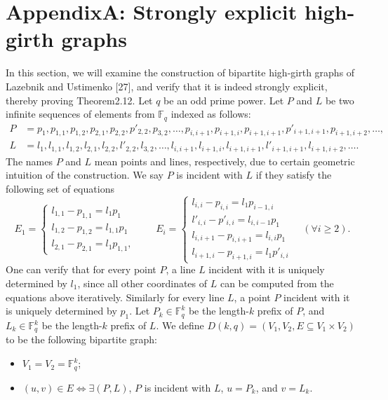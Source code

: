 \section*{AppendixA: Strongly explicit high-girth graphs}
In this section, we will examine the construction of bipartite high-girth graphs of Lazebnik and Ustimenko [27], and verify that it is indeed strongly explicit, thereby proving Theorem2.12.
Let $q$ be an odd prime power. Let $P$ and $L$ be two infinite sequences of elements from $\mathbb F_q$ indexed as follows:
\begin{align*}
P&=p_1,p_{1,1},p_{1,2},p_{2,1},p_{2,2},p'_{2,2},p_{3,2},\ldots,p_{i,i+1},p_{i+1,i},p_{i+1,i+1},p'_{i+1,i+1},p_{i+1,i+2},\ldots,\\
L&=l_1,l_{1,1},l_{1,2},l_{2,1},l_{2,2},l'_{2,2},l_{3,2},\ldots,l_{i,i+1},l_{i+1,i},l_{i+1,i+1},l'_{i+1,i+1},l_{i+1,i+2},\ldots.
\end{align*}
The names $P$ and $L$ mean points and lines, respectively, due to certain geometric intuition of the construction. We say $P$ is incident with $L$ if they satisfy the following set of equations
\begin{equation}\tag{3}
E_1=\begin{cases}l_{1,1}-p_{1,1}=l_1p_1\\l_{1,2}-p_{1,2}=l_{1,1}p_1\\l_{2,1}-p_{2,1}=l_1p_{1,1},\end{cases}\qquad
E_i=\begin{cases}l_{i,i}-p_{i,i}=l_1p_{i-1,i}\\l'_{i,i}-p'_{i,i}=l_{i,i-1}p_1\\l_{i,i+1}-p_{i,i+1}=l_{i,i}p_1\\l_{i+1,i}-p_{i+1,i}=l_1p'_{i,i}\end{cases}\quad(\forall i\ge2).
\end{equation}
One can verify that for every point $P$, a line $L$ incident with it is uniquely determined by $l_1$, since all other coordinates of $L$ can be computed from the equations above iteratively. Similarly for every line $L$, a point $P$ incident with it is uniquely determined by $p_1$.
Let $P_k\in\mathbb F_q^k$ be the length-$k$ prefix of $P$, and $L_k\in\mathbb F_q^k$ be the length-$k$ prefix of $L$. We define $D(k,q)=(V_1,V_2,E\subseteq V_1\times V_2)$ to be the following bipartite graph:
\begin{itemize}
\item $V_1=V_2=\mathbb F_q^k$;
\item $(u,v)\in E\Longleftrightarrow\exists(P,L)$, $P$ is incident with $L$, $u=P_k$, and $v=L_k$.
\end{itemize}
